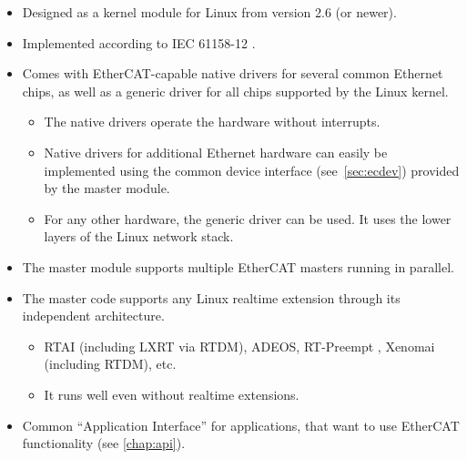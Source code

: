 \documentclass[a4paper,12pt,BCOR=6mm,bibtotoc,idxtotoc]{scrbook}
\begin{document}
\begin{itemize}

\item Designed as a kernel module for Linux from version 2.6 (or newer).

\item Implemented according to IEC 61158-12 \cite{dlspec} \cite{alspec}.

\item Comes with EtherCAT-capable native drivers for several common Ethernet
chips, as well as a generic driver for all chips supported by the Linux
kernel.

  \begin{itemize}

  \item The native drivers operate the hardware without interrupts.

  \item Native drivers for additional Ethernet hardware can easily be
  implemented using the common device interface (see~\autoref{sec:ecdev})
  provided by the master module.

  \item For any other hardware, the generic driver can be used. It uses the
  lower layers of the Linux network stack.

  \end{itemize}

\item The master module supports multiple EtherCAT masters running in
parallel.

\item The master code supports any Linux realtime extension through its
independent architecture.

  \begin{itemize}

  \item RTAI \cite{rtai}
  (including LXRT via RTDM), ADEOS, RT-Preempt \cite{rt-preempt}, Xenomai
  (including RTDM), etc.

  \item It runs well even without realtime extensions.

  \end{itemize}

\item Common ``Application Interface'' for applications, that want to use
EtherCAT functionality (see \autoref{chap:api}).


\end{itemize}
\end{document}
